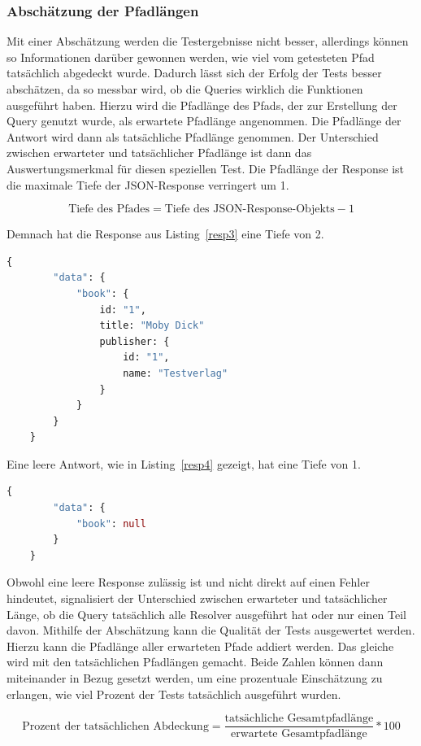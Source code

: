 \subsubsection{Abschätzung der Pfadlängen}

Mit einer Abschätzung werden die Testergebnisse nicht besser, allerdings können so Informationen darüber gewonnen werden, wie viel
vom getesteten Pfad tatsächlich abgedeckt wurde.
Dadurch lässt sich der Erfolg der Tests besser abschätzen, da so messbar wird, ob die Queries wirklich die Funktionen ausgeführt haben.
Hierzu wird die Pfadlänge des Pfads, der zur Erstellung der Query genutzt wurde, als erwartete Pfadlänge angenommen.
Die Pfadlänge der Antwort wird dann als tatsächliche Pfadlänge genommen.
Der Unterschied zwischen erwarteter und tatsächlicher Pfadlänge ist dann das Auswertungsmerkmal für diesen speziellen Test.
Die Pfadlänge der Response ist die maximale Tiefe der JSON-Response verringert um 1.

\[ \text{Tiefe des Pfades} = \text{Tiefe des JSON-Response-Objekts} - 1 \]

Demnach hat die Response aus Listing~\ref{resp3} eine Tiefe von 2.

\begin{lstlisting}[language=GraphQL, caption={vollständige Response}, label={resp3}]
    {
        "data": {
            "book": {
                id: "1",
                title: "Moby Dick"
                publisher: {
                    id: "1",
                    name: "Testverlag"
                }
            }
        }
    }
\end{lstlisting}

Eine leere Antwort, wie in Listing~\ref{resp4} gezeigt, hat eine Tiefe von 1.

\begin{lstlisting}[language=GraphQL, caption={mangelhafte Response}, label={resp4}]
    {
        "data": {
            "book": null
        }
    }
\end{lstlisting}

Obwohl eine leere Response zulässig ist und nicht direkt auf einen Fehler hindeutet, signalisiert der Unterschied zwischen erwarteter und tatsächlicher Länge,
ob die Query tatsächlich alle Resolver ausgeführt hat oder nur einen Teil davon.
Mithilfe der Abschätzung kann die Qualität der Tests ausgewertet werden.
Hierzu kann die Pfadlänge aller erwarteten Pfade addiert werden.
Das gleiche wird mit den tatsächlichen Pfadlängen gemacht.
Beide Zahlen können dann miteinander in Bezug gesetzt werden, um eine prozentuale Einschätzung zu erlangen, wie viel Prozent der Tests
tatsächlich ausgeführt wurden.
\begin{definition}
    \[ \text{Prozent der tatsächlichen Abdeckung} = \frac{\text{tatsächliche Gesamtpfadlänge}}{\text{erwartete Gesamtpfadlänge}} * 100 \]
\end{definition}


